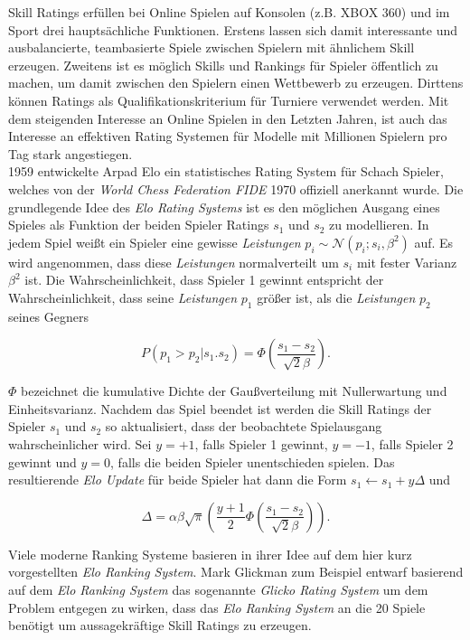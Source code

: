 \documentclass[12pt,a4paper]{scrartcl}
\numberwithin{equation}{section}
\begin{document}
Skill Ratings erfüllen bei Online Spielen auf Konsolen (z.B. XBOX 360) und im Sport drei hauptsächliche Funktionen. Erstens lassen sich damit interessante und ausbalancierte, teambasierte
Spiele zwischen Spielern mit ähnlichem Skill erzeugen. Zweitens ist es möglich Skills und Rankings für Spieler öffentlich zu machen, um damit zwischen den Spielern einen Wettbewerb zu erzeugen. 
Dirttens können Ratings als Qualifikationskriterium für Turniere verwendet werden. 
Mit dem steigenden Interesse an Online Spielen in den Letzten Jahren, ist auch das Interesse an effektiven Rating Systemen für Modelle mit Millionen Spielern pro Tag 
stark angestiegen.\\
1959 entwickelte Arpad Elo ein statistisches Rating System für Schach Spieler, welches von der \textit{World Chess Federation FIDE} 1970 offiziell anerkannt wurde.
Die grundlegende Idee des \textit{Elo Rating Systems} ist es den möglichen Ausgang eines Spieles als Funktion der beiden Spieler Ratings $s_1$ und $s_2$ zu modellieren. 
In jedem Spiel weißt ein Spieler eine gewisse \textit{Leistungen} $p_i \sim \mathcal{N}(p_i;s_i,\beta^2)$ auf. Es wird angenommen, dass diese \textit{Leistungen} normalverteilt um $s_i$ mit
fester Varianz $\beta^2$ ist. Die Wahrscheinlichkeit, dass Spieler 1 gewinnt entspricht der Wahrscheinlichkeit, dass seine \textit{Leistungen} $p_1$ größer ist, als die \textit{Leistungen} $p_2$ 
seines Gegners

\begin{equation}
 P(p_1 > p_2 | s_1. s_2) = \varPhi(\frac{s_1 - s_2}{\sqrt{2}\beta}).
\end{equation}

$\varPhi$ bezeichnet die kumulative Dichte der Gaußverteilung mit Nullerwartung und Einheitsvarianz.
Nachdem das Spiel beendet ist werden die Skill Ratings der Spieler $s_1$ und $s_2$ so aktualisiert, dass der beobachtete Spielausgang wahrscheinlicher wird. 
Sei $y = +1$, falls Spieler 1 gewinnt, $y = -1$, falls Spieler 2 gewinnt und $y = 0$, falls die beiden Spieler unentschieden spielen. 
Das resultierende \textit{Elo Update} für beide Spieler hat dann die Form $s_1 \leftarrow s_1 + y \Delta$ und 

\begin{equation}
 \Delta = \alpha \beta \sqrt{\pi} (\frac{y+1}{2} \varPhi(\frac{s_1 - s_2}{\sqrt{2} \beta})).
\end{equation}

Viele moderne Ranking Systeme basieren in ihrer Idee auf dem hier kurz vorgestellten \textit{Elo Ranking System}.
Mark Glickman zum Beispiel entwarf basierend auf dem \textit{Elo Ranking System} das sogenannte \textit{Glicko Rating System} um dem  Problem entgegen zu wirken, dass das \textit{Elo Ranking System} an die 20 Spiele
benötigt um aussagekräftige Skill Ratings zu erzeugen. \\
\end{document}
